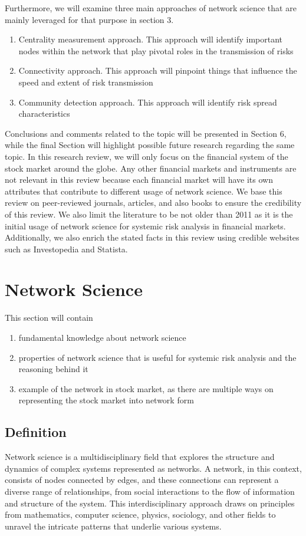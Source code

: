 \documentclass[a4paper,11pt]{article}
\begin{document}
Furthermore, we will examine three main approaches of network science that are mainly leveraged for that purpose in section 3.
\begin{enumerate}
        \item Centrality measurement approach. This approach will identify important nodes within the network that play pivotal roles in the transmission of risks
        \item Connectivity approach. This approach will pinpoint things that influence the speed and extent of risk transmission
        \item Community detection approach. This approach will identify risk spread characteristics
\end{enumerate}

Conclusions and comments related to the topic will be presented in Section 6, while the final Section will highlight possible future research regarding the same topic.
In this research review, we will only focus on the financial system of the stock market around the globe. Any other financial markets and instruments are not relevant in this review because each financial market will have its own attributes that contribute to different usage of network science.
We base this review on peer-reviewed journals, articles, and also books to ensure the credibility of this review. We also limit the literature to be not older than 2011 as it is the initial usage of network science for systemic risk analysis in financial markets. Additionally, we also enrich the stated facts in this review using credible websites such as Investopedia and Statista.

\section{Network Science}
This section will contain
\begin{enumerate}
    \item fundamental knowledge about network science
    \item properties of network science that is useful for systemic risk analysis and the reasoning behind it
    \item example of the network in stock market, as there are multiple ways on representing the stock market into network form
\end{enumerate}
\subsection{Definition}
Network science is a multidisciplinary field that explores the structure and dynamics of complex systems represented as networks. A network, in this context, consists of nodes connected by edges, and these connections can represent a diverse range of relationships, from social interactions to the flow of information and structure of the system. This interdisciplinary approach draws on principles from mathematics, computer science, physics, sociology, and other fields to unravel the intricate patterns that underlie various systems.
\end{document}
